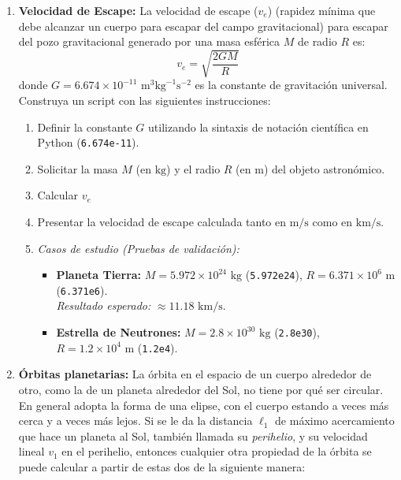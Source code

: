 \documentclass[12pt]{article}
\begin{document}
\begin{problemas}[]
\begin{enumerate}[leftmargin=*]
\begin{enumerate}[label=\alph*)]
    \item Utilice su programa para calcular las altitudes de satélites que 
    orbitan la Tierra una vez al día (la llamada órbita ``geoestacionaria'' o ``geosíncrona''), 
    una vez cada 90 minutos y una vez cada 45 minutos. 

\end{enumerate}

\item \textbf{Velocidad de Escape:}
La velocidad de escape ($v_e$) (rapidez mínima que debe alcanzar un cuerpo para escapar del campo gravitacional)
para escapar del pozo gravitacional generado por una masa esférica $M$ de radio $R$ es:
\begin{equation*}
    v_e = \sqrt{\frac{2 G M}{R}}
\end{equation*}
donde $G = 6.674 \times 10^{-11} \text{ m}^3 \text{kg}^{-1} \text{s}^{-2}$ 
es la constante de gravitación universal. Construya un script con las siguientes instrucciones:
\begin{enumerate}
    \item Definir la constante $G$ utilizando la sintaxis de notación científica en Python (\lstinline|6.674e-11|).
    \item Solicitar la masa $M$ (en $\text{kg}$) y el radio $R$ (en $\text{m}$) del objeto astronómico.
    \item Calcular $v_e$
    \item Presentar la velocidad de escape calculada tanto en $\text{m/s}$ como en $\text{km/s}$.
    \item \textit{Casos de estudio (Pruebas de validación):}
    \begin{itemize}
        \item \textbf{Planeta Tierra:} $M = 5.972 \times 10^{24} \text{ kg}$ (\lstinline|5.972e24|), $R = 6.371 \times 10^6 \text{ m}$ (\lstinline|6.371e6|). \\
        \textit{Resultado esperado:} $\approx 11.18 \text{ km/s}$.
        \item \textbf{Estrella de Neutrones:} $M = 2.8 \times 10^{30} \text{ kg}$ (\lstinline|2.8e30|), $R = 1.2 \times 10^4 \text{ m}$ (\lstinline|1.2e4|).
    \end{itemize}
\end{enumerate}

\item \textbf{Órbitas planetarias:}
La órbita en el espacio de un cuerpo alrededor de otro, como la de un planeta alrededor del Sol,
no tiene por qué ser circular. En general adopta la forma de una elipse, con el cuerpo estando a veces más 
cerca y a veces más lejos. Si se le da la distancia $\ell_1$ de máximo acercamiento que hace un 
planeta al Sol, también llamada su \textit{perihelio}, y su velocidad lineal $v_1$ en el perihelio, 
entonces cualquier otra propiedad de la órbita se puede calcular a partir de estas dos de la siguiente
manera:


\end{enumerate}
\end{problemas}
\end{document}
